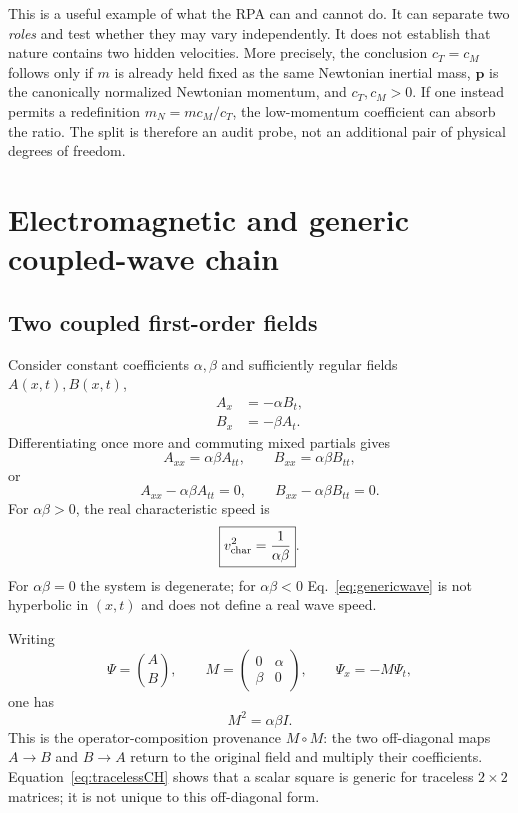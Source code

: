 \documentclass[11pt,a4paper]{article}
\begin{document}
This is a useful example of what the RPA can and cannot do. It can separate two \emph{roles} and test whether they may vary independently. It does not establish that nature contains two hidden velocities. More precisely, the conclusion $c_T=c_M$ follows only if $m$ is already held fixed as the same Newtonian inertial mass, $\bm p$ is the canonically normalized Newtonian momentum, and $c_T,c_M>0$. If one instead permits a redefinition $m_N=m c_M/c_T$, the low-momentum coefficient can absorb the ratio. The split is therefore an audit probe, not an additional pair of physical degrees of freedom.

\section{Electromagnetic and generic coupled-wave chain}
\subsection{Two coupled first-order fields}
Consider constant coefficients $\alpha,\beta$ and sufficiently regular fields $A(x,t),B(x,t)$,
\begin{align}
A_x&=-\alpha B_t,\\
B_x&=-\beta A_t.
\end{align}
Differentiating once more and commuting mixed partials gives
\begin{equation}
A_{xx}=\alpha\beta A_{tt},
\qquad
B_{xx}=\alpha\beta B_{tt},
\end{equation}
or
\begin{equation}
\boxed{A_{xx}-\alpha\beta A_{tt}=0},
\qquad
\boxed{B_{xx}-\alpha\beta B_{tt}=0}.
\label{eq:genericwave}
\end{equation}
For $\alpha\beta>0$, the real characteristic speed is
\begin{equation}
\boxed{v_{\rm char}^2=\frac1{\alpha\beta}}.
\label{eq:vab}
\end{equation}
For $\alpha\beta=0$ the system is degenerate; for $\alpha\beta<0$ Eq.~\eqref{eq:genericwave} is not hyperbolic in $(x,t)$ and does not define a real wave speed.

Writing
\begin{equation}
\Psi=\binom AB,
\qquad
M=\begin{pmatrix}0&\alpha\\\beta&0\end{pmatrix},
\qquad
\Psi_x=-M\Psi_t,
\end{equation}
one has
\begin{equation}
\boxed{M^2=\alpha\beta I}.
\label{eq:M2}
\end{equation}
This is the operator-composition provenance $M\circ M$: the two off-diagonal maps $A\to B$ and $B\to A$ return to the original field and multiply their coefficients. Equation~\eqref{eq:tracelessCH} shows that a scalar square is generic for traceless $2\times2$ matrices; it is not unique to this off-diagonal form.
\end{document}
